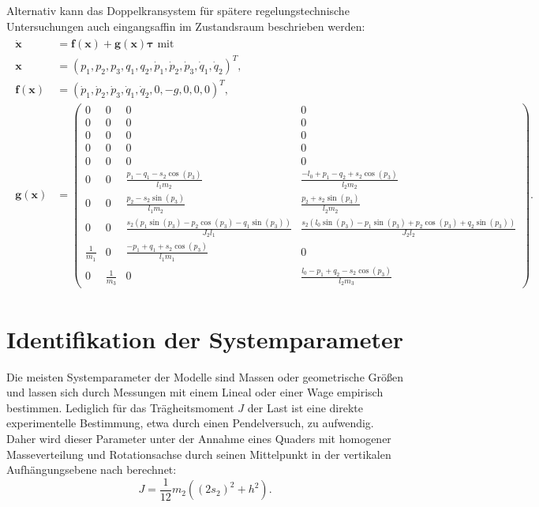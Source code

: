 Alternativ kann das Doppelkransystem für spätere regelungstechnische Untersuchungen auch eingangsaffin im Zustandsraum beschrieben werden:
\begin{align}
\label{eq:state_space_double_crane}
\begin{split}
\dot{\mathbf{x}} &= \mathbf{f}(\mathbf{x}) + \mathbf{g}(\mathbf{x}) \boldsymbol{\tau} \text{ mit } \\ 
\mathbf{x} &= (p_{1},	p_{2}, p_{3}, q_{1}, q_{2}, \dot{p}_{1}, \dot{p}_{2}, \dot{p}_{3}, \dot{q}_{1}, \dot{q}_{2})^T, \\
\mathbf{f}(\mathbf{x}) &= 
(\dot{p}_{1}, \dot{p}_{2}, \dot{p}_{3}, \dot{q}_{1}, \dot{q}_{2}, 0, -g, 0, 0, 0)^T, \\ 
\mathbf{g}(\mathbf{x}) &=
\left(\begin{smallmatrix}
0 & 0 & 0 & 0\\
0 & 0 & 0 & 0\\
0 & 0 & 0 & 0\\
0 & 0 & 0 & 0\\
0 & 0 & 0 & 0\\
0 & 0 & \frac{p_{1} - q_{1} - s_{2} \cos{\left(p_{3} \right)}}{l_{1} m_{2}} & \frac{- l_{0} + p_{1} - q_{2} + s_{2} \cos{\left(p_{3} \right)}}{l_{2} m_{2}}\\
0 & 0 & \frac{p_{2} - s_{2} \sin{\left(p_{3} \right)}}{l_{1} m_{2}} & \frac{p_{2} + s_{2} \sin{\left(p_{3} \right)}}{l_{2} m_{2}}\\
0 & 0 & \frac{s_{2} \left(p_{1} \sin{\left(p_{3} \right)} - p_{2} \cos{\left(p_{3} \right)} - q_{1} \sin{\left(p_{3} \right)}\right)}{J_{2} l_{1}} & \frac{s_{2} \left(l_{0} \sin{\left(p_{3} \right)} - p_{1} \sin{\left(p_{3} \right)} + p_{2} \cos{\left(p_{3} \right)} + q_{2} \sin{\left(p_{3} \right)}\right)}{J_{2} l_{2}}\\
\frac{1}{m_{1}} & 0 & \frac{- p_{1} + q_{1} + s_{2} \cos{\left(p_{3} \right)}}{l_{1} m_{1}} & 0\\
0 & \frac{1}{m_{3}} & 0 & \frac{l_{0} - p_{1} + q_{2} - s_{2} \cos{\left(p_{3} \right)}}{l_{2} m_{3}}
\end{smallmatrix}\right).
\end{split}
\end{align}

\section{Identifikation der Systemparameter}
\label{sec:SysIdent}

Die meisten Systemparameter der Modelle sind Massen oder geometrische Größen und lassen sich durch Messungen mit einem Lineal oder einer Wage empirisch bestimmen. Lediglich für das Trägheitsmoment $J$ der Last ist eine direkte experimentelle Bestimmung, etwa durch einen Pendelversuch, zu aufwendig. Daher wird dieser Parameter unter der Annahme eines Quaders mit homogener Masseverteilung und Rotationsachse durch seinen Mittelpunkt in der vertikalen Aufhängungsebene nach \cite{LastTraegheit} berechnet:
\begin{equation}
	J = \frac{1}{12} m_2 ((2 s_2)^2 + h^2).
\end{equation}

